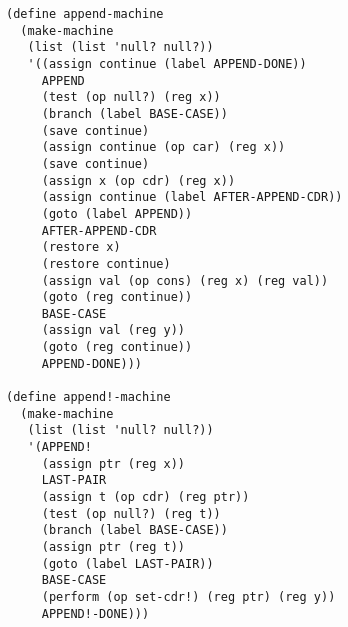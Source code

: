 \documentclass[a4paper,12pt]{article}
\begin{document}
\begin{lstlisting}
(define append-machine
  (make-machine
   (list (list 'null? null?))
   '((assign continue (label APPEND-DONE))
     APPEND
     (test (op null?) (reg x))
     (branch (label BASE-CASE))
     (save continue)
     (assign continue (op car) (reg x))
     (save continue)
     (assign x (op cdr) (reg x))
     (assign continue (label AFTER-APPEND-CDR))
     (goto (label APPEND))
     AFTER-APPEND-CDR
     (restore x)
     (restore continue)
     (assign val (op cons) (reg x) (reg val))
     (goto (reg continue))
     BASE-CASE
     (assign val (reg y))
     (goto (reg continue))
     APPEND-DONE)))

(define append!-machine
  (make-machine
   (list (list 'null? null?))
   '(APPEND!
     (assign ptr (reg x))
     LAST-PAIR
     (assign t (op cdr) (reg ptr))
     (test (op null?) (reg t))
     (branch (label BASE-CASE))
     (assign ptr (reg t))
     (goto (label LAST-PAIR))
     BASE-CASE
     (perform (op set-cdr!) (reg ptr) (reg y))
     APPEND!-DONE)))
\end{lstlisting}
\end{document}
